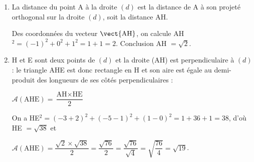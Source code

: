 \begin{enumerate}
\begin{enumerate}
			et $\vect{\text{AH}} \cdot \vect{\delta} = - 1 + 0 + 1 = 0$, ce qui montre que les vecteurs $\vect{\text{AH}}$ et $\vect{\delta}$ sont orthogonaux donc que les droites (AH) et ($d$) sont perpendiculaires.

			Le point H est le projeté orthogonal de A sur $(d)$.

			\item La distance du point A à la droite $(d)$ est la distance de A à son projeté orthogonal sur la droite $(d)$, soit la distance AH.

			Des coordonnées du vecteur $\vect{\text{AH}}$, on calcule AH$^2 = (- 1)^2 + 0^2 + 1^2 = 1 + 1 = 2$. Conclusion AH $ = \sqrt 2$.

			\item H et E sont deux points de $(d)$ et la droite (AH) est perpendiculaire à $(d)$ : le triangle AHE est donc rectangle en H et son aire est égale au demi-produit des longueurs de ses côtés perpendiculaires :

			$\mathcal{A}(\text{AHE}) = \dfrac{\text{AH} \times \text{HE}}{2}$

			On a HE$^2 = (- 3 + 2)^2 + (- 5 - 1)^2 + (1 - 0)^2 = 1 + 36 + 1 = 38$, d'où HE $ = \sqrt{38}$ et

			$\mathcal{A}(\text{AHE}) = \dfrac{\sqrt 2 \times \sqrt{38}}{2} = \dfrac{\sqrt{76}}{2} = \dfrac{\sqrt{76}}{\sqrt4} = \sqrt{\dfrac{76}{4}} = \sqrt{19}$.
		\end{enumerate}
	\end{enumerate}
